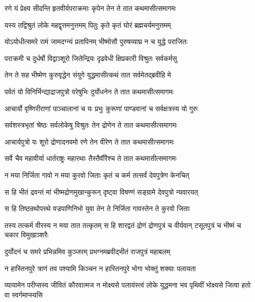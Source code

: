 \twolineshloka
{रणे यं प्रेक्ष्य सीदन्ति हृतवीर्यपराक्रमाः}
{कृपेन तेन ते तात कथमासीत्समागमः}


\twolineshloka
{यस्य तद्विश्रुतं लोके महद्वृत्तमनुत्तमम्}
{पितुः कृते कृतं घोरं ब्रह्मचर्यमनुत्तमम्}


\twolineshloka
{योऽयोधीत्समरे रामं जामदग्न्यं प्रतापिनम्}
{भीष्मोसौ पुरुषव्याघ्र न च युद्धे पराजितः}


\twolineshloka
{पराक्रमी च दुर्धर्षो विद्वाञ्शूरो जितेन्द्रियः}
{दृढवेधी क्षिप्रकारी विश्रुतः सर्वकर्मसु}


\twolineshloka
{तेन ते सह भीष्मेण कुरुवृद्धेन संयुगे}
{युद्धमासीत्कथं तात सर्वमेतद्ब्रवीहि मे}


\twolineshloka
{पर्वतं यो विनिर्भिन्द्याद्राजपुत्रो वरेषुभिः}
{दुर्योधनेन ते तात कथमासीत्समागमः}


\twolineshloka
{आचार्यो वृष्णिरीराणां पाञ्चालानां च यः प्रभुः}
{कुरूणां पाण्डवानां च सर्वक्षत्रस्य यो गुरुः}


\twolineshloka
{सर्वशस्त्रभृतां श्रेष्ठः सर्वलोकेषु विश्रुतः}
{तेन द्रोणेन ते तात कथमासीत्समागमः}


\twolineshloka
{आचार्यपुत्रो यः शूरो द्रोणादनवमो रणे}
{तेन वीरेण ते तात कथमासीत्समागमः}


\twolineshloka
{सर्वे चैव महावीर्या धार्तराष्ट्रः महारथाः}
{तैस्तैर्वीरैश्च ते तात कथमासीत्समागमः}




\twolineshloka
{न मया निर्जिता गावो न मया कुरवो जिताः}
{कृतं च कर्म तत्सर्वं देवपुत्रेण केनचित्}


\twolineshloka
{स हि भीतं द्रवन्तं मां भीष्मद्रोणमुखान्कुरून्}
{दृष्ट्वा विषण्णं सङ्ग्रामे देवपुत्रो न्यवारयत्}


\twolineshloka
{स हि तिष्ठन्रथोपस्थे वज्रपाणिनिभो युवा}
{तेन ते निर्जिता गावस्तेन ते कुरवो जिताः}


\threelineshloka
{तस्य तत्कर्म वीरस्य न मया तात तत्कृतम्}
{स हि शारद्वतं द्रोणं द्रोणपुत्रं च वीर्यवान्}
{टसूतपुत्रं च भीष्मं च चकार विमुखाञ्शरैः}


\twolineshloka
{दुर्योदनं च समरे प्रभिन्नमिव कुञ्जरम्}
{प्रभग्नमब्रवीद्भीतं राजपुत्रं महाबलम्}


\twolineshloka
{न हास्तिनपुरे त्राणं तव पश्यामि किञ्चन}
{न हास्तिनपुरे भोगा भोक्तुं शक्याः पलायता}


\threelineshloka
{व्यायामेन परीप्सस्व जीवितं कौरवात्मज}
{न मोक्ष्यसे पलायंस्त्वं लोके युद्धमना भव}
{पृथिवीं भोक्ष्यसे जित्वा हतो वा स्वर्गमाप्स्यसि}


